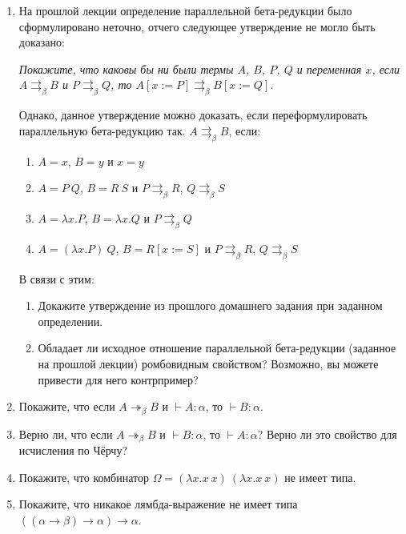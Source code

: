 \documentclass[10pt,a4paper,oneside]{article}
\begin{document}
\begin{enumerate}
\item На прошлой лекции определение параллельной бета-редукции было сформулировано неточно,
отчего следующее утверждение не могло быть доказано:

{\itshape Покажите, что каковы бы ни были термы $A$, $B$, $P$, $Q$ и переменная $x$, 
если $A \rightrightarrows_\beta B$ и $P \rightrightarrows_\beta Q$, то 
$A[x := P] \rightrightarrows_\beta B[x := Q]$.}

Однако, данное утверждение можно доказать, если переформулировать параллельную 
бета-редукцию так. $A \rightrightarrows_\beta B$, если:
\begin{enumerate}
\item $A=x$, $B=y$ и $x=y$
\item $A = P\ Q$, $B = R\ S$ и $P\rightrightarrows_\beta R$, $Q\rightrightarrows_\beta S$
\item $A = \lambda x.P$, $B = \lambda x.Q$ и $P\rightrightarrows_\beta Q$
\item $A = (\lambda x.P)\ Q$, $B = R [x := S]$ и $P\rightrightarrows_\beta R$, $Q\rightrightarrows_\beta S$
\end{enumerate}

В связи с этим:

\begin{enumerate}
\item Докажите утверждение из прошлого домашнего задания при заданном определении.
\item Обладает ли исходное отношение параллельной бета-редукции (заданное на прошлой лекции) ромбовидным свойством?
Возможно, вы можете привести для него контрпример?
\end{enumerate}

\item Покажите, что если $A\twoheadrightarrow_\beta B$ и $\vdash A:\alpha$, то $\vdash B:\alpha$.

\item Верно ли, что если $A\twoheadrightarrow_\beta B$ и $\vdash B:\alpha$, то $\vdash A:\alpha$?
Верно ли это свойство для исчисления по Чёрчу?

\item Покажите, что комбинатор $\Omega = (\lambda x.x\ x)\ (\lambda x.x\ x)$ не имеет типа.

\item Покажите, что никакое лямбда-выражение не имеет типа $((\alpha\rightarrow\beta)\rightarrow\alpha)\rightarrow\alpha$.


\end{enumerate}
\end{document}
